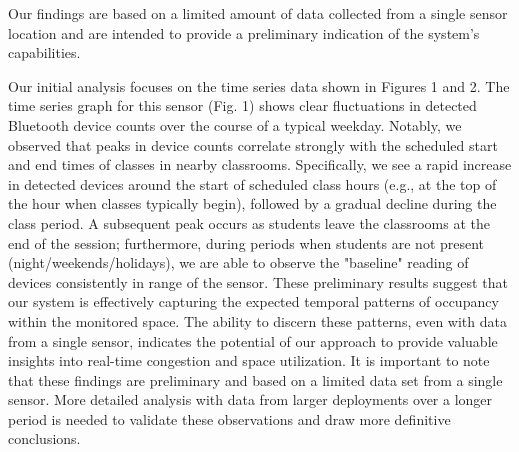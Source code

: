 \documentclass[runningheads]{llncs}
\begin{document}
Our findings are based on a limited amount of data collected from a single sensor location and are intended to provide a preliminary indication of the system's capabilities.

Our initial analysis focuses on the time series data shown in Figures 1 and 2. The time series graph for this sensor (Fig. 1) shows clear
fluctuations in detected Bluetooth device counts over the course of a typical weekday. Notably, we observed that peaks in device counts correlate strongly
with the scheduled start and end times of classes in nearby classrooms. 
Specifically, we see a rapid increase in detected devices around the start of scheduled class hours (e.g., at the top of the hour when classes typically begin),
followed by a gradual decline during the class period. A subsequent peak occurs as students leave the classrooms at the end of the session; furthermore, during
periods when students are not present (night/weekends/holidays), we are able to observe the "baseline" reading of devices consistently in range of the sensor.
These preliminary results suggest that our system is effectively capturing the expected temporal patterns of occupancy within the monitored space. The ability
to discern these patterns, even with data from a single sensor, indicates the potential of our approach to provide valuable insights into real-time congestion
and space utilization. It is important to note that these findings are preliminary and based on a limited data set from a single sensor. More detailed analysis with data from larger deployments over a longer period is needed to validate these observations and draw more definitive conclusions.
\end{document}

